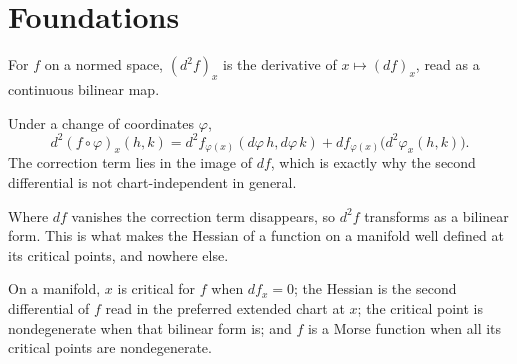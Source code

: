 %

\chapter{Foundations}

\begin{definition}
  \label{def:sndFDeriv}
  \leanok
  For $f$ on a normed space, $(d^2f)_x$ is the derivative of $x \mapsto (df)_x$,
  read as a continuous bilinear map.
\end{definition}

\begin{theorem}
  \label{thm:sndFDeriv_comp}
  \leanok
  Under a change of coordinates $\varphi$,
  \[ d^2(f\circ\varphi)_x(h,k) = d^2f_{\varphi(x)}(d\varphi\, h, d\varphi\, k)
     + df_{\varphi(x)}\bigl(d^2\varphi_x(h,k)\bigr). \]
  The correction term lies in the image of $df$, which is exactly why the second
  differential is not chart-independent in general.
\end{theorem}

\begin{corollary}
  \label{cor:sndFDeriv_critical}
  \leanok
  Where $df$ vanishes the correction term disappears, so $d^2f$ transforms as a
  bilinear form.  This is what makes the Hessian of a function on a manifold well
  defined at its critical points, and nowhere else.
\end{corollary}

\begin{definition}
  \label{def:hessian}
  \leanok
  On a manifold, $x$ is critical for $f$ when $d f_x = 0$; the Hessian is the
  second differential of $f$ read in the preferred extended chart at $x$; the
  critical point is nondegenerate when that bilinear form is; and $f$ is a Morse
  function when all its critical points are nondegenerate.
\end{definition}

